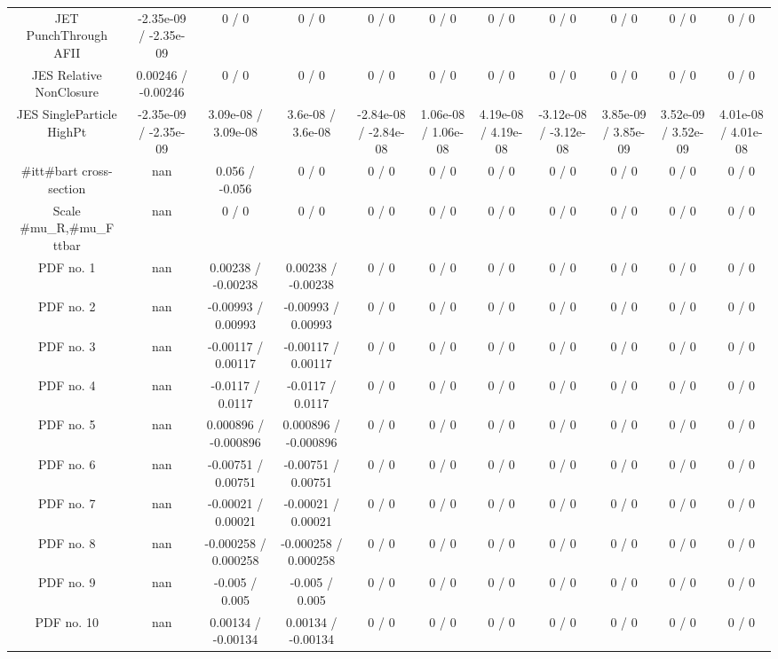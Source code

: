 \begin{table}[htbp]
\begin{center}
\begin{tabular}{|c|c|c|c|c|c|c|c|c|c|c|}
  JET PunchThrough AFII & -2.35e-09 / -2.35e-09 & 0 / 0 & 0 / 0 & 0 / 0 & 0 / 0 & 0 / 0 & 0 / 0 & 0 / 0 & 0 / 0 & 0 / 0 \\ 
  JES Relative NonClosure & 0.00246 / -0.00246 & 0 / 0 & 0 / 0 & 0 / 0 & 0 / 0 & 0 / 0 & 0 / 0 & 0 / 0 & 0 / 0 & 0 / 0 \\ 
  JES SingleParticle HighPt & -2.35e-09 / -2.35e-09 & 3.09e-08 / 3.09e-08 & 3.6e-08 / 3.6e-08 & -2.84e-08 / -2.84e-08 & 1.06e-08 / 1.06e-08 & 4.19e-08 / 4.19e-08 & -3.12e-08 / -3.12e-08 & 3.85e-09 / 3.85e-09 & 3.52e-09 / 3.52e-09 & 4.01e-08 / 4.01e-08 \\ 
  #it{t#bar{t}} cross-section &    nan    & 0.056 / -0.056 & 0 / 0 & 0 / 0 & 0 / 0 & 0 / 0 & 0 / 0 & 0 / 0 & 0 / 0 & 0 / 0 \\ 
  Scale #mu_{R},#mu_{F} ttbar &    nan    & 0 / 0 & 0 / 0 & 0 / 0 & 0 / 0 & 0 / 0 & 0 / 0 & 0 / 0 & 0 / 0 & 0 / 0 \\ 
  PDF no. 1 &    nan    & 0.00238 / -0.00238 & 0.00238 / -0.00238 & 0 / 0 & 0 / 0 & 0 / 0 & 0 / 0 & 0 / 0 & 0 / 0 & 0 / 0 \\ 
  PDF no. 2 &    nan    & -0.00993 / 0.00993 & -0.00993 / 0.00993 & 0 / 0 & 0 / 0 & 0 / 0 & 0 / 0 & 0 / 0 & 0 / 0 & 0 / 0 \\ 
  PDF no. 3 &    nan    & -0.00117 / 0.00117 & -0.00117 / 0.00117 & 0 / 0 & 0 / 0 & 0 / 0 & 0 / 0 & 0 / 0 & 0 / 0 & 0 / 0 \\ 
  PDF no. 4 &    nan    & -0.0117 / 0.0117 & -0.0117 / 0.0117 & 0 / 0 & 0 / 0 & 0 / 0 & 0 / 0 & 0 / 0 & 0 / 0 & 0 / 0 \\ 
  PDF no. 5 &    nan    & 0.000896 / -0.000896 & 0.000896 / -0.000896 & 0 / 0 & 0 / 0 & 0 / 0 & 0 / 0 & 0 / 0 & 0 / 0 & 0 / 0 \\ 
  PDF no. 6 &    nan    & -0.00751 / 0.00751 & -0.00751 / 0.00751 & 0 / 0 & 0 / 0 & 0 / 0 & 0 / 0 & 0 / 0 & 0 / 0 & 0 / 0 \\ 
  PDF no. 7 &    nan    & -0.00021 / 0.00021 & -0.00021 / 0.00021 & 0 / 0 & 0 / 0 & 0 / 0 & 0 / 0 & 0 / 0 & 0 / 0 & 0 / 0 \\ 
  PDF no. 8 &    nan    & -0.000258 / 0.000258 & -0.000258 / 0.000258 & 0 / 0 & 0 / 0 & 0 / 0 & 0 / 0 & 0 / 0 & 0 / 0 & 0 / 0 \\ 
  PDF no. 9 &    nan    & -0.005 / 0.005 & -0.005 / 0.005 & 0 / 0 & 0 / 0 & 0 / 0 & 0 / 0 & 0 / 0 & 0 / 0 & 0 / 0 \\ 
  PDF no. 10 &    nan    & 0.00134 / -0.00134 & 0.00134 / -0.00134 & 0 / 0 & 0 / 0 & 0 / 0 & 0 / 0 & 0 / 0 & 0 / 0 & 0 / 0 \\ 

\end{tabular}
\end{center}
\end{table}
